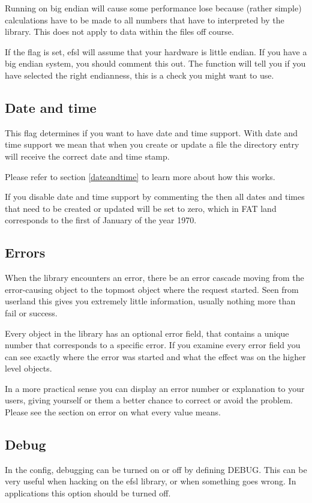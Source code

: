 Running on big endian will cause some performance lose because (rather simple) calculations have
to be made to all numbers that have to interpreted by the library. This does not apply to
data within the files off course.

If the flag  is set, efsl will assume that your hardware is little endian.
If you have a big endian system, you should comment this out. The function 
will tell you if you have selected the right endianness, this is a check you might want to use.

\subsection{Date and time}
This flag determines if you want to have date and time support. With date and time support we
mean that when you create or update a file the directory entry will receive the correct date and
time stamp.

Please refer to section \ref{dateandtime} to learn more about how this works.

If you disable date and time support by commenting the  then
all dates and times that need to be created or updated will be set to zero, which in FAT land corresponds to the first of January of the year 1970.

\subsection{Errors}
When the library encounters an error, there be an error cascade moving from the error-causing object
to the topmost object where the request started. Seen from userland this gives you extremely little
information, usually nothing more than fail or success.

Every object in the library has an optional error field, that contains a unique number that
corresponds to a specific error. If you examine every error field you can see exactly where the
error was started and what the effect was on the higher level objects.

In a more practical sense you can display an error number or explanation to your users, giving
yourself or them a better chance to correct or avoid the problem.
Please see the section on error on what every value means.

\subsection{Debug}
In the config, debugging can be turned on or off by defining DEBUG. This can be
very useful when hacking on the efsl library, or when something goes wrong.
In applications this option should be turned off.

